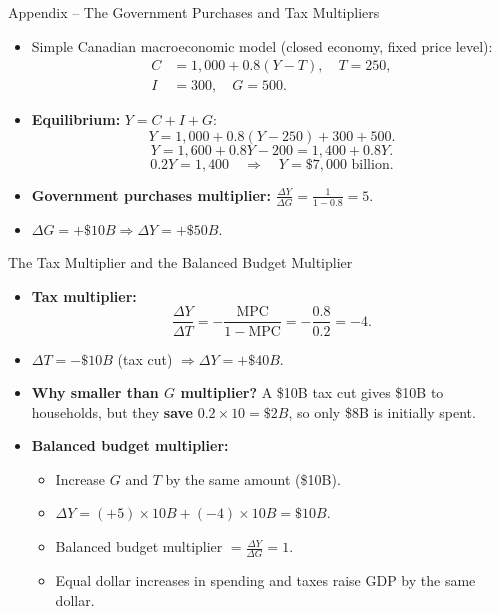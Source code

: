 \documentclass[aspectratio=169]{beamer}
\begin{document}
\begin{frame}{Appendix -- The Government Purchases and Tax Multipliers}
\transfade
\begin{itemize}
  \item Simple Canadian macroeconomic model (closed economy, fixed price level):
  \begin{align*}
    C &= 1{,}000 + 0.8(Y - T), \quad T = 250, \\
    I &= 300, \quad G = 500.
  \end{align*}
  \item \textbf{Equilibrium:} $Y = C + I + G$:
  \[
    Y = 1{,}000 + 0.8(Y - 250) + 300 + 500.
  \]
  \[
    Y = 1{,}600 + 0.8Y - 200 = 1{,}400 + 0.8Y.
  \]
  \[
    0.2Y = 1{,}400 \quad \Rightarrow \quad Y = \$7{,}000\text{ billion}.
  \]
  \item \textbf{Government purchases multiplier:} $\frac{\Delta Y}{\Delta G} = \frac{1}{1 - 0.8} = 5$.
  \item $\Delta G = +\$10B \Rightarrow \Delta Y = +\$50B$.
\end{itemize}
\end{frame}

\begin{frame}{The Tax Multiplier and the Balanced Budget Multiplier}
\transfade
\begin{itemize}
  \item \textbf{Tax multiplier:}
  \[
    \frac{\Delta Y}{\Delta T} = -\frac{\text{MPC}}{1 - \text{MPC}} = -\frac{0.8}{0.2} = -4.
  \]
  \item $\Delta T = -\$10B$ (tax cut) $\Rightarrow \Delta Y = +\$40B$.
  \item \textbf{Why smaller than $G$ multiplier?} A \$10B tax cut gives \$10B to households, but they \textbf{save} $0.2 \times 10 = \$2B$, so only \$8B is initially spent.
  \item \textbf{Balanced budget multiplier:}
  \begin{itemize}
    \item Increase $G$ and $T$ by the same amount (\$10B).
    \item $\Delta Y = (+5) \times 10B + (-4) \times 10B = \$10B$.
    \item Balanced budget multiplier $= \frac{\Delta Y}{\Delta G} = 1$.
    \item Equal dollar increases in spending and taxes raise GDP by the same dollar.
  \end{itemize}
\end{itemize}
\end{frame}
\end{document}
